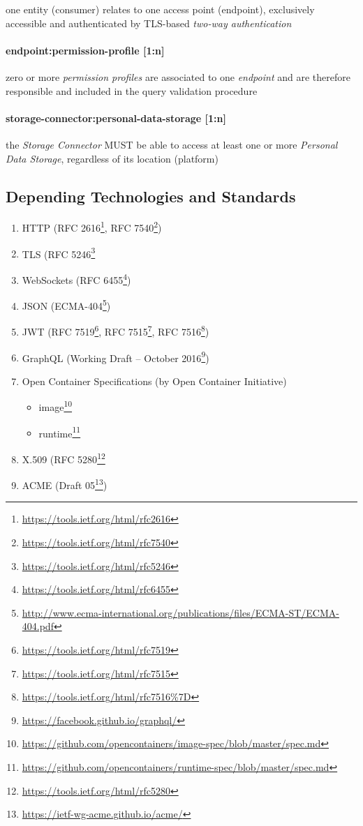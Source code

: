 \documentclass[12pt,english,a4paper,titlepage,cleardoublepage=empty,dottedtoc]{report}
\renewcommand{\href}[2]{#2\footnote{\url{#1}}}
\providecommand{\tightlist}{%
  \setlength{\itemsep}{0pt}\setlength{\parskip}{0pt}}
\begin{document}
one entity (consumer) relates to one access point (endpoint),
exclusively accessible and authenticated by TLS-based \emph{two-way
authentication}

\paragraph{endpoint:permission-profile
{[}1:n{]}}\label{endpointpermission-profile-1n}

zero or more \emph{permission profiles} are associated to one
\emph{endpoint} and are therefore responsible and included in the query
validation procedure

\paragraph{storage-connector:personal-data-storage
{[}1:n{]}}\label{storage-connectorpersonal-data-storage-1n}

the \emph{Storage Connector} MUST be able to access at least one or more
\emph{Personal Data Storage}, regardless of its location (platform)

\subsection{Depending Technologies and
Standards}\label{depending-technologies-and-standards}

\begin{enumerate}
\def\labelenumi{\alph{enumi})}
\tightlist
\item
  HTTP (\href{https://tools.ietf.org/html/rfc2616}{RFC 2616},
  \href{https://tools.ietf.org/html/rfc7540}{RFC 7540})
\item
  TLS (\href{https://tools.ietf.org/html/rfc5246}{RFC 5246}
\item
  WebSockets (\href{https://tools.ietf.org/html/rfc6455}{RFC 6455})
\item
  JSON
  (\href{http://www.ecma-international.org/publications/files/ECMA-ST/ECMA-404.pdf}{ECMA-404})
\item
  JWT (\href{https://tools.ietf.org/html/rfc7519}{RFC 7519},
  \href{https://tools.ietf.org/html/rfc7515}{RFC 7515},
  \href{https://tools.ietf.org/html/rfc7516\%7D}{RFC 7516})
\item
  GraphQL (\href{https://facebook.github.io/graphql/}{Working Draft --
  October 2016})
\item
  Open Container Specifications (by Open Container Initiative)

  \begin{itemize}
  \tightlist
  \item
    \href{https://github.com/opencontainers/image-spec/blob/master/spec.md}{image}
  \item
    \href{https://github.com/opencontainers/runtime-spec/blob/master/spec.md}{runtime}
  \end{itemize}
\item
  X.509 (\href{https://tools.ietf.org/html/rfc5280}{RFC 5280}
\item
  ACME (\href{https://ietf-wg-acme.github.io/acme/}{Draft 05})
\end{enumerate}
\end{document}
